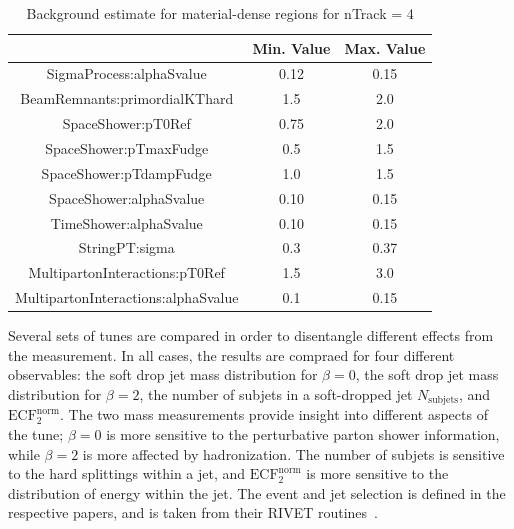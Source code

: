 \begin{table}[ht!]
\caption{Background estimate for material-dense regions for nTrack = 4}
\centering\begin{tabular}{ | c | | c | c | } \hline
                                     & Min. Value   & Max. Value    \\ \hline
SigmaProcess:alphaSvalue             &  0.12        & 0.15    \\ \hline
BeamRemnants:primordialKThard        &  1.5         & 2.0     \\ \hline
SpaceShower:pT0Ref                   &  0.75        & 2.0     \\ \hline
SpaceShower:pTmaxFudge               &  0.5         & 1.5     \\ \hline
SpaceShower:pTdampFudge              &  1.0         & 1.5     \\ \hline
SpaceShower:alphaSvalue              &  0.10        & 0.15    \\ \hline
TimeShower:alphaSvalue               &  0.10        & 0.15    \\ \hline
StringPT:sigma                       &  0.3         & 0.37    \\ \hline
MultipartonInteractions:pT0Ref       &  1.5         & 3.0     \\ \hline
MultipartonInteractions:alphaSvalue  &  0.1         & 0.15    \\ \hline
\end{tabular}
\label{tab:parameterSpace}
\end{table}

Several sets of tunes are compared in order to disentangle different effects from the measurement. In all cases, the results are compraed for four different observables:
the soft drop jet mass distribution for $\beta=0$, the soft drop jet mass distribution for $\beta=2$, the number of subjets in a soft-dropped jet $N_{\mathrm{subjets}}$, and $\mathrm{ECF}_2^{\mathrm{norm}}$.
The two mass measurements provide insight into different aspects of the tune; $\beta=0$ is more sensitive to the perturbative parton shower information, 
while $\beta=2$ is more affected by hadronization. The number of subjets is sensitive to the hard splittings within a jet, and $\mathrm{ECF}_2^{\mathrm{norm}}$ is more sensitive to the 
distribution of energy within the jet. The event and jet selection is defined in the respective papers, and is taken from their RIVET routines~\cite{rivet}.


